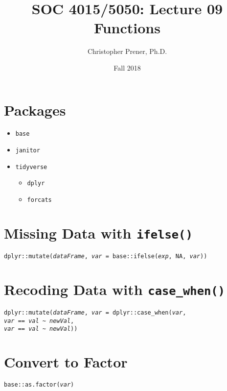 \documentclass{tufte-handout}
\title{SOC 4015/5050: Lecture 09 Functions}
\author{Christopher Prener, Ph.D.}
\date{Fall 2018}
\begin{document}
\maketitle %

\vspace{5mm}
\section{Packages}
\begin{itemize}
\item \texttt{base}
\item \texttt{janitor}
\item \texttt{tidyverse}
\begin{itemize}
\item \texttt{dplyr}
\item \texttt{forcats}
\end{itemize}
\end{itemize}

\vspace{5mm}
\section{Missing Data with \texttt{ifelse()}}
\noindent \texttt{dplyr::}{\color{red}\texttt{mutate}}\texttt{(\textit{dataFrame}, \textit{var} = base::}{\color{red}\texttt{ifelse}}\texttt{(\textit{exp}, NA, \textit{var}))}

\vspace{5mm}
\section{Recoding Data with \texttt{case\_when()}}
\noindent \texttt{dplyr::}{\color{red}\texttt{mutate}}\texttt{(\textit{dataFrame}, \textit{var} = dplyr::}{\color{red}\texttt{case\_when}}\texttt{(\textit{var}, \\ \textit{var} == \textit{val} \textasciitilde{} \textit{newVal}, \\ \textit{var} == \textit{val} \textasciitilde{} \textit{newVal}))}

\vspace{5mm}
\section{Convert to Factor}
\noindent \texttt{base::}{\color{red}\texttt{as.factor}}\texttt{(\textit{var})}
\end{document}
